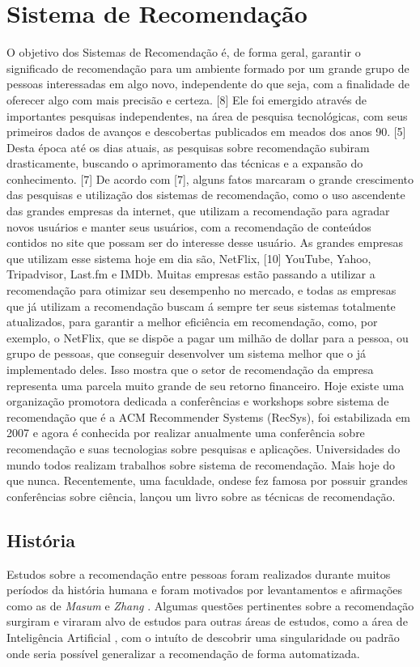 \documentclass[12pt,
				openright,
				twoside,
				a4paper,
				apter=TITLE,
				section=TITLE,
				subsection=TITLE,
				chapter=TITLE,
				english,
				brazil]{abntex2}
\begin{document}
\chapter{Sistema de Recomendação}
O objetivo dos Sistemas de Recomendação é, de forma geral, garantir o significado de recomendação para um ambiente formado por um grande grupo de pessoas interessadas em algo novo, independente do que seja, com a finalidade de oferecer algo com mais precisão e certeza. [8] Ele foi emergido através de importantes pesquisas independentes, na área de pesquisa tecnológicas, com seus primeiros dados de avanços e descobertas publicados em meados dos anos 90. [5] Desta época até os dias atuais, as pesquisas sobre recomendação subiram drasticamente, buscando o aprimoramento das técnicas e a expansão do conhecimento. [7] 
De acordo com [7], alguns fatos marcaram o grande crescimento das pesquisas e utilização dos sistemas de recomendação, como o uso ascendente das grandes empresas da internet, que utilizam a recomendação para agradar novos usuários e manter seus usuários, com a recomendação de conteúdos contidos no site que possam ser do interesse desse usuário. As grandes empresas que utilizam esse sistema hoje em dia são, NetFlix, [10] YouTube, Yahoo, Tripadvisor, Last.fm e IMDb. Muitas empresas estão passando a utilizar a recomendação para otimizar seu desempenho no mercado, e todas as empresas que já utilizam a recomendação buscam á sempre ter seus sistemas totalmente atualizados, para garantir a melhor eficiência em recomendação, como, por exemplo, o NetFlix, que se dispõe a pagar um milhão de dollar para a pessoa, ou grupo de pessoas, que conseguir desenvolver um sistema melhor que o já implementado deles. Isso mostra que o setor de recomendação da empresa representa uma parcela muito grande de seu retorno financeiro. 
Hoje existe uma organização promotora dedicada a conferências e workshops sobre sistema de recomendação que é a ACM Recommender Systems (RecSys), foi estabilizada em 2007 e agora é conhecida por realizar anualmente uma conferência sobre recomendação e suas tecnologias sobre pesquisas e aplicações.
Universidades do mundo todos realizam trabalhos sobre sistema de recomendação. Mais hoje do que nunca. Recentemente, uma faculdade, ondese fez famosa por possuir grandes conferências sobre ciência, lançou um livro sobre as técnicas de recomendação.


\section{História}
Estudos sobre a recomendação entre pessoas foram realizados durante muitos períodos da história humana e foram motivados por levantamentos e afirmações como as de \textit{Masum} e \textit{Zhang} \cite{masum2004manifesto}. Algumas questões pertinentes sobre a recomendação surgiram e viraram alvo de estudos para outras áreas de estudos, como a área de Inteligência Artificial \cite{ramos2008ambient}, com o intuíto de descobrir uma singularidade ou padrão onde seria possível generalizar a recomendação de forma automatizada.
\end{document}
